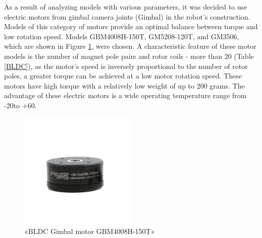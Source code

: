 As a result of analyzing models with various parameters, it was decided to use electric motors from gimbal camera joints (Gimbal) in the robot's construction. Models of this category of motors provide an optimal balance between torque and low rotation speed. Models GBM4008H-150T, GM5208-120T, and GM3506, which are shown in Figure \ref{GBM4008H}, were chosen. A characteristic feature of these motor models is the number of magnet pole pairs and rotor coils - more than 20 (Table \ref{BLDC}), as the motor's speed is inversely proportional to the number of rotor poles, a greater torque can be achieved at a low motor rotation speed. These motors have high torque with a relatively low weight of up to 200 grams. The advantage of these electric motors is a wide operating temperature range from -20\textdegree to +60\textdegree \citep{simplefocBLDCMotors}.


\begin{figure}[H]
	\centering
	\includegraphics[width=0.5\textwidth,trim={5cm 10cm 5cm 10cm}]{Src/images/GM4008H-1.png}
	\caption{«BLDC Gimbal motor GBM4008H-150T»}
	\label{GBM4008H}
\end{figure}


